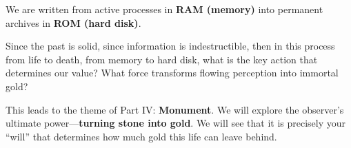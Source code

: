 We are written from active processes in \textbf{RAM (memory)} into permanent archives in \textbf{ROM (hard disk)}.

Since the past is solid, since information is indestructible, then in this process from life to death, from memory to hard disk, what is the key action that determines our value? What force transforms flowing perception into immortal gold?

This leads to the theme of Part IV: \textbf{Monument}. We will explore the observer's ultimate power---\textbf{turning stone into gold}. We will see that it is precisely your ``will'' that determines how much gold this life can leave behind.

